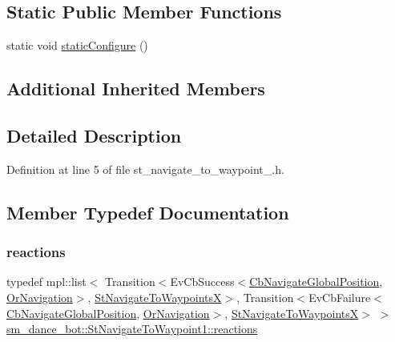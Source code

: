\subsection*{Static Public Member Functions}
\begin{DoxyCompactItemize}
\item 
static void \hyperlink{structsm__dance__bot_1_1StNavigateToWaypoint1_ae64899be8775f9ac0aaaead84c5cba5f}{static\+Configure} ()
\end{DoxyCompactItemize}
\subsection*{Additional Inherited Members}


\subsection{Detailed Description}


Definition at line 5 of file st\+\_\+navigate\+\_\+to\+\_\+waypoint\+\_.\+h.



\subsection{Member Typedef Documentation}
\mbox{\label{structsm__dance__bot_1_1StNavigateToWaypoint1_a97717f60fbf1d73dafe96f9af8718d78}} 
\subsubsection{\texorpdfstring{reactions}{reactions}}
{\footnotesize\ttfamily typedef mpl\+::list$<$ Transition$<$Ev\+Cb\+Success$<$\hyperlink{classcl__move__base__z_1_1CbNavigateGlobalPosition}{Cb\+Navigate\+Global\+Position}, \hyperlink{classsm__dance__bot_1_1OrNavigation}{Or\+Navigation}$>$, \hyperlink{structsm__dance__bot_1_1StNavigateToWaypointsX}{St\+Navigate\+To\+WaypointsX}$>$, Transition$<$Ev\+Cb\+Failure$<$\hyperlink{classcl__move__base__z_1_1CbNavigateGlobalPosition}{Cb\+Navigate\+Global\+Position}, \hyperlink{classsm__dance__bot_1_1OrNavigation}{Or\+Navigation}$>$, \hyperlink{structsm__dance__bot_1_1StNavigateToWaypointsX}{St\+Navigate\+To\+WaypointsX}$>$ $>$ \hyperlink{structsm__dance__bot_1_1StNavigateToWaypoint1_a97717f60fbf1d73dafe96f9af8718d78}{sm\+\_\+dance\+\_\+bot\+::\+St\+Navigate\+To\+Waypoint1\+::reactions}}



